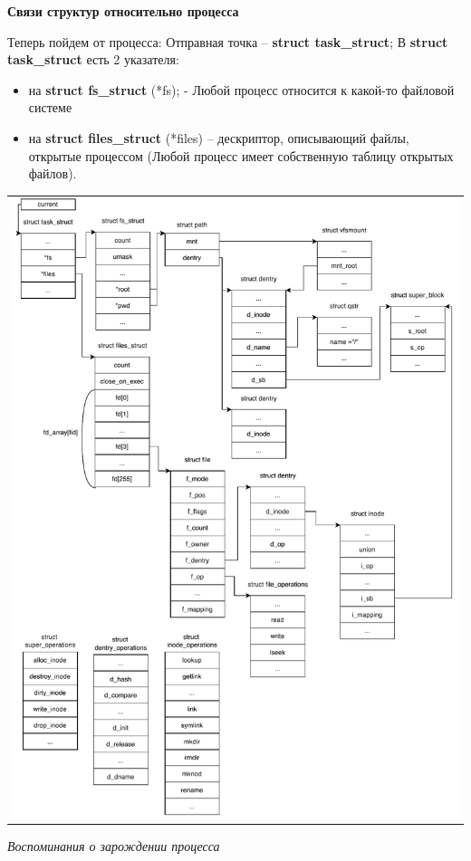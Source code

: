 \textbf{Связи структур относительно процесса}
\par Теперь пойдем от процесса: Отправная точка -- \textbf{struct task\_struct};
В \textbf{struct task\_struct} есть 2 указателя: 
\begin{itemize}
\item на \textbf{struct fs\_struct} (*fs); - Любой процесс относится к какой-то файловой системе
\item на \textbf{struct files\_struct} (*files) -- дескриптор, описывающий файлы, открытые процессом (Любой процесс имеет собственную таблицу открытых файлов).
\end{itemize}

\begin{table}[H]
  \centering
  \begin{tabular}{p{1\linewidth}}
    \centering
    \includegraphics[width=0.8\linewidth]{./images/struct_connect_proc.pdf}
  \end{tabular}
\end{table}

\textit{Воспоминания о зарождении процесса}


